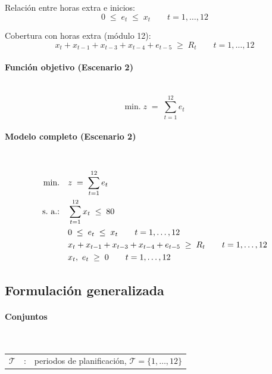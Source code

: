 \noindent Relación entre horas extra e inicios:
\begin{equation}
    0 \;\leq\; e_t \;\leq\; x_t \qquad t=1,\dots,12
\end{equation}

\noindent Cobertura con horas extra (módulo 12):
\begin{equation}
    x_t + x_{t-1} + x_{t-3} + x_{t-4} + e_{t-5} \;\geq\; R_t \qquad t=1,\dots,12
\end{equation}

\paragraph{Función objetivo (Escenario 2)}\mbox{}\\
\begin{equation}
\mbox{min.}\; z \;=\; \sum_{t=1}^{12} e_t
\end{equation}

\paragraph{Modelo completo (Escenario 2)}\mbox{}\\
\begin{align}
\mbox{min.}\quad & z \;=\; \sum_{t=1}^{12} e_t \notag \\
\mbox{s.\ a.:}\quad 
& \sum_{t=1}^{12} x_t \;\leq\; 80 \notag \\
& 0 \;\leq\; e_t \;\leq\; x_t \qquad t=1,\dots,12 \notag \\
& x_t + x_{t-1} + x_{t-3} + x_{t-4} + e_{t-5} \;\geq\; R_t \qquad t=1,\dots,12 \notag \\
& x_t,\ e_t \;\geq\; 0 \qquad t=1,\dots,12 \notag
\end{align}

\subsection{Formulación generalizada}

\paragraph{Conjuntos}\mbox{}\\
\begin{tabular}{l c l}
    $\mathcal{T}$ & : & periodos de planificación, $\mathcal{T}=\{1,\dots,12\}$\\
\end{tabular}

